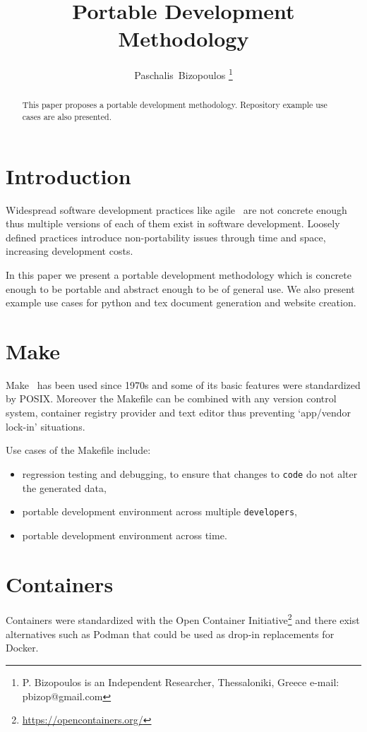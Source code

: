\documentclass[journal]{IEEEtran}
\begin{document}
\title{Portable Development Methodology}

\author{Paschalis~Bizopoulos
\thanks{P. Bizopoulos is an Independent Researcher, Thessaloniki, Greece e-mail: pbizop@gmail.com}}

\maketitle

\begin{abstract}
	This paper proposes a portable development methodology.
	Repository example use cases are also presented.
\end{abstract}

\section{Introduction}
Widespread software development practices like agile~\cite{abrahamsson2017agile} are not concrete enough thus multiple versions of each of them exist in software development.
Loosely defined practices introduce non-portability issues through time and space, increasing development costs.

In this paper we present a portable development methodology which is concrete enough to be portable and abstract enough to be of general use.
We also present example use cases for python and tex document generation and website creation.

\section{Make}
Make~\cite{fowler1990case} has been used since 1970s and some of its basic features were standardized by POSIX\@.
Moreover the Makefile can be combined with any version control system, container registry provider and text editor thus preventing `app/vendor lock-in' situations.

Use cases of the Makefile include:
\begin{itemize}
	\item regression testing and debugging, to ensure that changes to \texttt{code} do not alter the generated data,
	\item portable development environment across multiple \texttt{developers},
	\item portable development environment across time.
\end{itemize}

\section{Containers}
Containers were standardized with the Open Container Initiative\footnote{\url{https://opencontainers.org/}} and there exist alternatives such as Podman that could be used as drop-in replacements for Docker.
\end{document}
